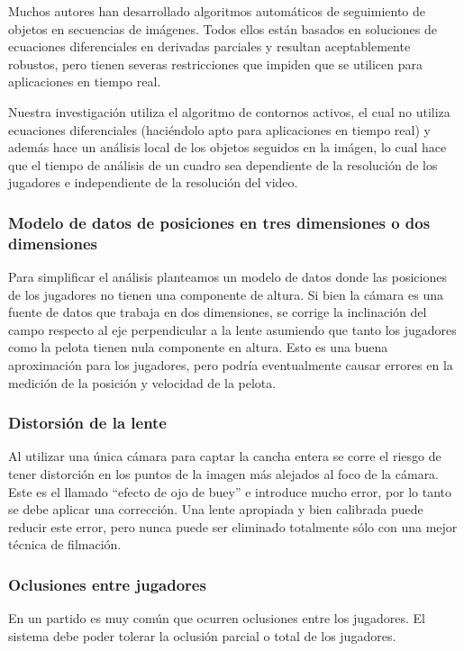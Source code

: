 \documentclass[a4paper,10pt]{article}
\begin{document}
Muchos autores han desarrollado algoritmos automáticos de seguimiento de
objetos en secuencias de imágenes. Todos ellos están basados en soluciones de
ecuaciones diferenciales en derivadas parciales y resultan aceptablemente
robustos, pero tienen severas restricciones que impiden que se utilicen para
aplicaciones en tiempo real.

Nuestra investigación utiliza el algoritmo de contornos activos, el cual no
utiliza ecuaciones diferenciales (haciéndolo apto para aplicaciones en tiempo
real) y además hace un análisis local de los objetos seguidos en la imágen, lo
cual hace que el tiempo de análisis de un cuadro sea dependiente de la
resolución de los jugadores e independiente de la resolución del video.

\subsubsection{Modelo de datos de posiciones en tres dimensiones o dos
dimensiones}

Para simplificar el análisis planteamos un modelo de datos donde las posiciones
de los jugadores no tienen una componente de altura. Si bien la cámara es una
fuente de datos que trabaja en dos dimensiones, se corrige la inclinación del
campo respecto al eje perpendicular a la lente asumiendo que tanto los
jugadores como la pelota tienen nula componente en altura. Esto es una buena
aproximación para los jugadores, pero podría eventualmente causar errores en la
medición de la posición y velocidad de la pelota.

\subsubsection{Distorsión de la lente}

Al utilizar una única cámara para captar la cancha entera se corre el riesgo de
tener distorción en los puntos de la imagen más alejados al foco de la cámara.
Este es el llamado ``efecto de ojo de buey'' e introduce mucho error, por lo
tanto se debe aplicar una corrección. Una lente apropiada y bien calibrada
puede reducir este error, pero nunca puede ser eliminado totalmente sólo con
una mejor técnica de filmación.

\subsubsection{Oclusiones entre jugadores}

En un partido es muy común que ocurren oclusiones entre los jugadores. El
sistema debe poder tolerar la oclusión parcial o total de los jugadores.
\end{document}
